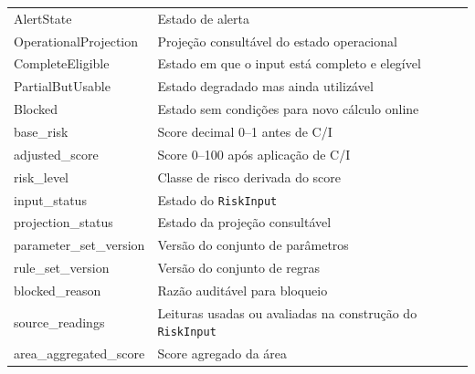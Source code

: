\begin{longtable}{@{}>{\raggedright\arraybackslash}p{}>{\raggedright\arraybackslash}p{}@{}}
AlertState & Estado de alerta \\
OperationalProjection & Projeção consultável do estado operacional \\
CompleteEligible & Estado em que o input está completo e elegível \\
PartialButUsable & Estado degradado mas ainda utilizável \\
Blocked & Estado sem condições para novo cálculo online \\
base\_risk & Score decimal 0–1 antes de C/I \\
adjusted\_score & Score 0–100 após aplicação de C/I \\
risk\_level & Classe de risco derivada do score \\
input\_status & Estado do \texttt{RiskInput} \\
projection\_status & Estado da projeção consultável \\
parameter\_set\_version & Versão do conjunto de parâmetros \\
rule\_set\_version & Versão do conjunto de regras \\
blocked\_reason & Razão auditável para bloqueio \\
source\_readings & Leituras usadas ou avaliadas na construção do \texttt{RiskInput} \\
area\_aggregated\_score & Score agregado da área \\
\end{longtable}
\endgroup
